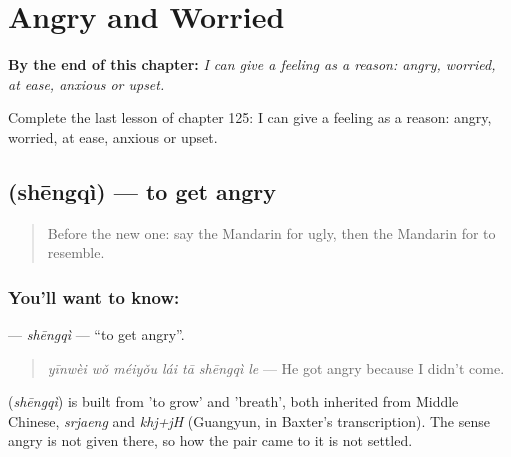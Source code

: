 
\chapter{Angry and Worried}
\label{ch:zh-angry-and-worried}

\begin{chapteropening}
\textbf{By the end of this chapter:} \emph{I can give a feeling as a reason: angry, worried, at ease, anxious or upset.}

Complete the last lesson of chapter 125: I can give a feeling as a reason: angry, worried, at ease, anxious or upset.
\end{chapteropening}

\section[\texorpdfstring{\zh{生气} (shēngqì)}{生气 (shēngqì)}]{ (shēngqì) — to get angry}

\label{lesson:ZH-C125-shengqi}



\begin{quote}
Before the new one: say the Mandarin for ugly, then the Mandarin for to resemble.
\end{quote}

\subsection*{You'll want to know: }
\textbf{} — \emph{shēngqì} — \textquotedblleft{}to get angry\textquotedblright{}.

\begin{quote}
\textbf{} \emph{yīnwèi wǒ méiyǒu lái tā shēngqì le} — He got angry because I didn't come.
\end{quote}

\begin{cousinweb}
\textbf{} (\emph{shēngqì}) is built from  'to grow' and  'breath', both inherited from Middle Chinese, \emph{srjaeng} and \emph{khj+jH} (Guangyun, in Baxter's transcription). The sense angry is not given there, so how the pair came to it is not settled.
\end{cousinweb}

